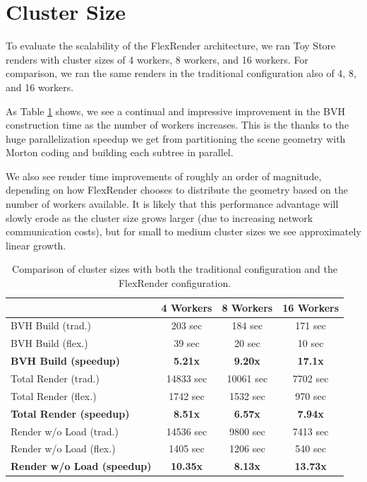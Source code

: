 \documentclass[12pt]{ucthesis}
\begin{document}
\section{Cluster Size}
\label{clustersize}

To evaluate the scalability of the FlexRender architecture, we ran Toy Store
renders with cluster sizes of 4 workers, 8 workers, and 16 workers. For
comparison, we ran the same renders in the traditional configuration also of
4, 8, and 16 workers.

As Table \ref{tb:clustersize} shows, we see a continual and impressive
improvement in the BVH construction time as the number of workers increases.
This is the thanks to the huge parallelization speedup we get from partitioning
the scene geometry with Morton coding and building each subtree in parallel.

We also see render time improvements of roughly an order of magnitude, depending
on how FlexRender chooses to distribute the geometry based on the number of workers
available. It is likely that this performance advantage will slowly erode as the
cluster size grows larger (due to increasing network communication costs), but
for small to medium cluster sizes we see approximately linear growth.

\begin{table}
\begin{center}
\begin{tabular}{|l||c|c|c|}
    \hline
    & 4 Workers & 8 Workers & 16 Workers \\
    \hline
    \hline
    BVH Build (trad.) & 203 sec & 184 sec & 171 sec \\
    \hline
    BVH Build (flex.) & 39 sec & 20 sec & 10 sec \\
    \hline
    \textbf{BVH Build (speedup)} & \textbf{5.21x} & \textbf{9.20x} & \textbf{17.1x} \\
    \hline
    \hline
    Total Render (trad.) & 14833 sec & 10061 sec & 7702 sec \\
    \hline
    Total Render (flex.) & 1742 sec & 1532 sec & 970 sec \\
    \hline
    \textbf{Total Render (speedup)} & \textbf{8.51x} & \textbf{6.57x} & \textbf{7.94x} \\
    \hline
    \hline
    Render w/o Load (trad.) & 14536 sec & 9800 sec & 7413 sec \\
    \hline
    Render w/o Load (flex.) & 1405 sec & 1206 sec & 540 sec \\
    \hline
    \textbf{Render w/o Load (speedup)} & \textbf{10.35x} & \textbf{8.13x} & \textbf{13.73x} \\
    \hline
\end{tabular}
\caption{Comparison of cluster sizes with both the traditional configuration and the FlexRender configuration.}
\label{tb:clustersize}
\end{center}
\end{table}
\end{document}

